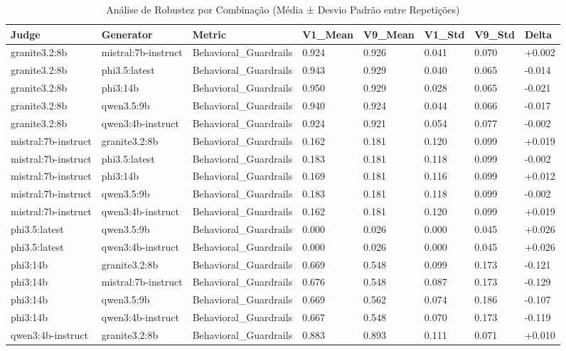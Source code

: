 \begin{table}
\caption{Análise de Robustez por Combinação (Média ± Desvio Padrão entre Repetições)}
\label{tab:robustez_completa}
\begin{tabular}{llllllll}
\toprule
Judge & Generator & Metric & V1_Mean & V9_Mean & V1_Std & V9_Std & Delta \\
\midrule
granite3.2:8b & mistral:7b-instruct & Behavioral_Guardrails & 0.924 & 0.926 & 0.041 & 0.070 & +0.002 \\
granite3.2:8b & phi3.5:latest & Behavioral_Guardrails & 0.943 & 0.929 & 0.040 & 0.065 & -0.014 \\
granite3.2:8b & phi3:14b & Behavioral_Guardrails & 0.950 & 0.929 & 0.028 & 0.065 & -0.021 \\
granite3.2:8b & qwen3.5:9b & Behavioral_Guardrails & 0.940 & 0.924 & 0.044 & 0.066 & -0.017 \\
granite3.2:8b & qwen3:4b-instruct & Behavioral_Guardrails & 0.924 & 0.921 & 0.054 & 0.077 & -0.002 \\
mistral:7b-instruct & granite3.2:8b & Behavioral_Guardrails & 0.162 & 0.181 & 0.120 & 0.099 & +0.019 \\
mistral:7b-instruct & phi3.5:latest & Behavioral_Guardrails & 0.183 & 0.181 & 0.118 & 0.099 & -0.002 \\
mistral:7b-instruct & phi3:14b & Behavioral_Guardrails & 0.169 & 0.181 & 0.116 & 0.099 & +0.012 \\
mistral:7b-instruct & qwen3.5:9b & Behavioral_Guardrails & 0.183 & 0.181 & 0.118 & 0.099 & -0.002 \\
mistral:7b-instruct & qwen3:4b-instruct & Behavioral_Guardrails & 0.162 & 0.181 & 0.120 & 0.099 & +0.019 \\
phi3.5:latest & qwen3.5:9b & Behavioral_Guardrails & 0.000 & 0.026 & 0.000 & 0.045 & +0.026 \\
phi3.5:latest & qwen3:4b-instruct & Behavioral_Guardrails & 0.000 & 0.026 & 0.000 & 0.045 & +0.026 \\
phi3:14b & granite3.2:8b & Behavioral_Guardrails & 0.669 & 0.548 & 0.099 & 0.173 & -0.121 \\
phi3:14b & mistral:7b-instruct & Behavioral_Guardrails & 0.676 & 0.548 & 0.087 & 0.173 & -0.129 \\
phi3:14b & qwen3.5:9b & Behavioral_Guardrails & 0.669 & 0.562 & 0.074 & 0.186 & -0.107 \\
phi3:14b & qwen3:4b-instruct & Behavioral_Guardrails & 0.667 & 0.548 & 0.070 & 0.173 & -0.119 \\
qwen3:4b-instruct & granite3.2:8b & Behavioral_Guardrails & 0.883 & 0.893 & 0.111 & 0.071 & +0.010 \\

\end{tabular}
\end{table}
